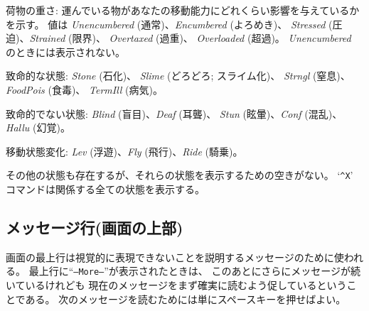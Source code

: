荷物の重さ:
運んでいる物があなたの移動能力にどれくらい影響を与えているかを示す。
値は {\it Unencumbered} (通常)、{\it Encumbered} (よろめき)、
{\it Stressed} (圧迫)、{\it Strained} (限界)、
{\it Overtaxed} (過重)、 {\it Overloaded} (超過)。
{\it Unencumbered} のときには表示されない。

致命的な状態:
{\it Stone\/} (石化)、
{\it Slime\/} (どろどろ; スライム化)、
{\it Strngl\/} (窒息)、
{\it FoodPois\/} (食毒)、
{\it TermIll\/} (病気)。

致命的でない状態:
{\it Blind\/} (盲目)、{\it Deaf\/} (耳聾)、
{\it Stun\/} (眩暈)、{\it Conf\/} (混乱)、{\it Hallu\/} (幻覚)。

移動状態変化:
{\it Lev\/} (浮遊)、{\it Fly\/} (飛行)、{\it Ride\/} (騎乗)。

その他の状態も存在するが、それらの状態を表示するための空きがない。
`{\tt \^{}X}' コマンドは関係する全ての状態を表示する。
\elist

\subsection*{メッセージ行(画面の上部)}

画面の最上行は視覚的に表現できないことを説明するメッセージのために使われる。
最上行に``{\tt --More--}''が表示されたときは、
このあとにさらにメッセージが続いているけれども
現在のメッセージをまず確実に読むよう促しているということである。
次のメッセージを読むためには単にスペースキーを押せばよい。

